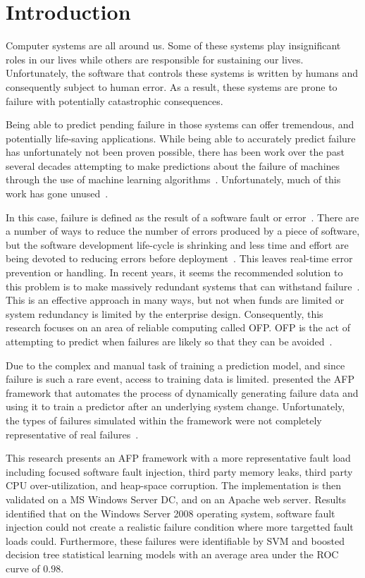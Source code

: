 \section{Introduction} \label{chapter1}
Computer systems are all around us.  Some of these systems play insignificant
roles in our lives while others are responsible for sustaining our lives.
Unfortunately, the software that controls these systems is written by humans
and consequently subject to human error.  As a result, these systems are prone
to failure with potentially catastrophic consequences.  

Being able to predict pending failure in those systems can offer tremendous,
and potentially life-saving applications.  While being able to accurately
predict failure has unfortunately not been proven possible, there has been work
over the past several decades attempting to make predictions about the failure
of machines through the use of machine learning
algorithms~\citep{salfnerSurvey}.  Unfortunately, much of this work has gone
unused~\citep{irrera2015}.  

In this case, failure is defined as the result of a software fault or
error~\citep{salfnerSurvey}.  There are a number of ways to reduce the number
of errors produced by a piece of software, but the software development
life-cycle is shrinking and less time and effort are being devoted to reducing
errors before deployment~\citep{schmidt2016}.  This leaves real-time error
prevention or handling.  In recent years, it seems the recommended solution to
this problem is to make massively redundant systems that can withstand
failure~\citep{bauer2012}.  This is an effective approach in many ways, but not
when funds are limited or system redundancy is limited by the enterprise
design.  Consequently, this research focuses on an area of reliable computing
called \ac{OFP}.  \ac{OFP} is the act of attempting to predict when failures
are likely so that they can be avoided~\citep{salfnerSurvey}.  

Due to the complex and manual task of training a prediction model, and since
failure is such a rare event, access to training data is limited.
\citet{irrera2015} presented the \ac{AFP} framework that automates the process
of dynamically generating failure data and using it to train a predictor after
an underlying system change.  Unfortunately, the types of failures simulated
within the framework were not completely representative of real
failures~\citep{kikuchi2014}.

This research presents an \ac{AFP} framework with a more representative fault
load including focused software fault injection, third party memory leaks,
third party \ac{CPU} over-utilization, and heap-space corruption.  The
implementation is then validated on a \ac{MS} Windows Server \ac{DC}, and on an
Apache web server.  Results identified that on the Windows Server 2008
operating system, software fault injection could not create a realistic failure
condition where more targetted fault loads could.  Furthermore, these failures
were identifiable by \ac{SVM} and boosted decision tree statistical learning
models with an average area under the \ac{ROC} curve of $0.98$.
